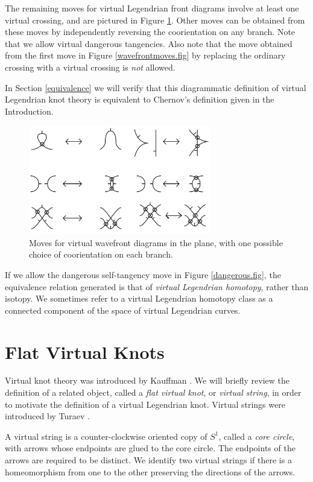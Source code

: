 The remaining moves for virtual Legendrian front diagrams involve at least one virtual crossing, and are pictured in Figure \ref{virtualwavefrontmoves.fig}.  Other moves can be obtained from these moves by independently reversing the coorientation on any branch.  Note that we allow virtual dangerous tangencies. Also note that the move obtained from the first move in Figure \ref{wavefrontmoves.fig} by replacing the ordinary crossing with a virtual crossing is {\it not} allowed.  

In Section \ref{equivalence} we will verify that this diagrammatic definition of virtual Legendrian knot theory is equivalent to Chernov's definition given in the Introduction.


\begin{figure}[htbp]
	\centering
		\includegraphics[width=8cm]{virtualwavefrontmoves}
		\caption{Moves for virtual wavefront diagrams in the plane, with one possible choice of coorientation on each branch.}
		\label{virtualwavefrontmoves.fig}
\end{figure}

If we allow the dangerous self-tangency move in Figure \ref{dangerous.fig}, the equivalence relation generated is that of {\it virtual Legendrian homotopy}, rather than isotopy.  We sometimes refer to a virtual Legendrian homotopy class as a connected component of the space of virtual Legendrian curves.

\section{Flat Virtual Knots}\label{virtualstrings}
Virtual knot theory was introduced by Kauffman \cite{Kauffman}.  We will briefly review the definition of a related object, called a {\it flat virtual knot}, or {\it virtual string}, in order to motivate the definition of a virtual Legendrian knot.  Virtual strings were introduced by Turaev \cite{Turaev}.


A virtual string is a counter-clockwise oriented copy of $S^1$, called a {\it core circle}, with arrows whose endpoints are glued to the core circle.  The endpoints of the arrows are required to be distinct.  We identify two virtual strings if there is a homeomorphism from one to the other preserving the directions of the arrows.

